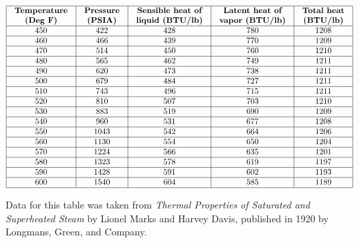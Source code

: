 $$\vbox{\offinterlineskip
\halign{\strut
\vrule \quad\hfil # \ \hfil & 
\vrule \quad\hfil # \ \hfil & 
\vrule \quad\hfil # \ \hfil & 
\vrule \quad\hfil # \ \hfil & 
\vrule \quad\hfil # \ \hfil \vrule \cr
\noalign{\hrule}
%
{\bf Temperature} & {\bf Pressure} & {\bf Sensible heat of} & {\bf Latent heat of} & {\bf Total heat} \cr
{\bf (Deg F)} & {\bf (PSIA)} & {\bf liquid (BTU/lb)} & {\bf vapor (BTU/lb)} & {\bf (BTU/lb)} \cr
%
\noalign{\hrule}
%
450 & 422 & 428 & 780 & 1208 \cr
%
\noalign{\hrule}
%
460 & 466 & 439 & 770 & 1209 \cr
%
\noalign{\hrule}
%
470 & 514 & 450 & 760 & 1210 \cr
%
\noalign{\hrule}
%
480 & 565 & 462 & 749 & 1211 \cr
%
\noalign{\hrule}
%
490 & 620 & 473 & 738 & 1211 \cr
%
\noalign{\hrule}
%
500 & 679 & 484 & 727 & 1211 \cr
%
\noalign{\hrule}
%
510 & 743 & 496 & 715 & 1211 \cr
%
\noalign{\hrule}
%
520 & 810 & 507 & 703 & 1210 \cr
%
\noalign{\hrule}
%
530 & 883 & 519 & 690 & 1209 \cr
%
\noalign{\hrule}
%
540 & 960 & 531 & 677 & 1208 \cr
%
\noalign{\hrule}
%
550 & 1043 & 542 & 664 & 1206 \cr
%
\noalign{\hrule}
%
560 & 1130 & 554 & 650 & 1204 \cr
%
\noalign{\hrule}
%
570 & 1224 & 566 & 635 & 1201 \cr
%
\noalign{\hrule}
%
580 & 1323 & 578 & 619 & 1197 \cr
%
\noalign{\hrule}
%
590 & 1428 & 591 & 602 & 1193 \cr
%
\noalign{\hrule}
%
600 & 1540 & 604 & 585 & 1189 \cr
%
\noalign{\hrule}
} %
}$$ %















Data for this table was taken from {\it Thermal Properties of Saturated and Superheated Steam} by Lionel Marks and Harvey Davis, published in 1920 by Longmans, Green, and Company. 



